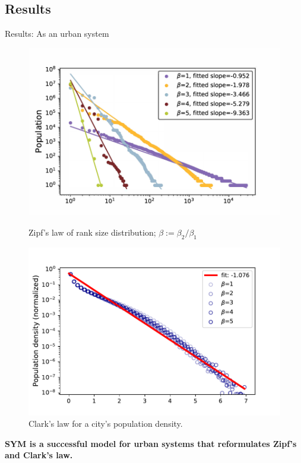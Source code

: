 \subsection{Results}
\begin{frame}{Results: As an urban system}
    \begin{figure}
    
        \centering
        \begin{minipage}{0.48\linewidth}
        \includegraphics[width = 0.9\linewidth]{Pics/zipf.pdf}
        \caption{Zipf's law of rank size distribution; $\beta:=\beta_2/\beta_1$}
        \end{minipage}
        \begin{minipage}{0.48\linewidth}
        \includegraphics[width = 0.9\linewidth]{Pics/kernal_density.pdf}
        \caption{Clark's law for a city's population density.}
        \label{fig:Zipf}
        \end{minipage}
    \end{figure}
    
    \textbf{SYM is a successful model for urban systems that reformulates Zipf's and Clark's law.}
\end{frame}

